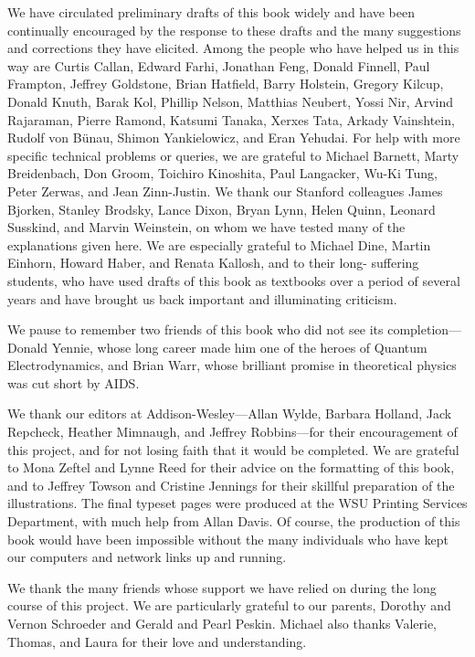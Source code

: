 We have circulated preliminary drafts of this book widely and have been
continually encouraged by the response to these drafts and the many
suggestions and corrections they have elicited.  Among the people who have
helped us in this way are Curtis Callan, Edward Farhi, Jonathan Feng,
Donald Finnell, Paul Frampton, Jeffrey Goldstone, Brian Hatfield, Barry
Holstein, Gregory Kilcup, Donald Knuth, Barak Kol, Phillip Nelson,
Matthias Neubert, Yossi Nir, Arvind Rajaraman, Pierre Ramond, Katsumi
Tanaka, Xerxes Tata, Arkady Vainshtein, Rudolf von B\"unau, Shimon
Yankielowicz, and Eran Yehudai.  For help with more specific technical
problems or queries, we are grateful to Michael Barnett, Marty
Breidenbach, Don Groom, Toichiro Kinoshita, Paul Langacker, Wu-Ki Tung,
Peter Zerwas, and Jean Zinn-Justin.  We thank our Stanford colleagues
James Bjorken, Stanley Brodsky, Lance Dixon, Bryan Lynn, Helen Quinn,
Leonard Susskind, and Marvin Weinstein, on whom we have tested many of the
explanations given here.  We are especially grateful to Michael Dine,
Martin Einhorn, Howard Haber, and Renata Kallosh, and to their long-
suffering students, who have used drafts of this book as textbooks over a
period of several years and have brought us back important and
illuminating criticism.

We pause to remember two friends of this book who did not see its
completion---Donald Yennie, whose long career made him one of the heroes
of Quantum Electrodynamics, and Brian Warr, whose brilliant promise in
theoretical physics was cut short by AIDS.

We thank our editors at Addison-Wesley---Allan Wylde, Barbara Holland,
Jack Repcheck, Heather Mimnaugh, and Jeffrey Robbins---for their
encouragement of this project, and for not losing faith that it would be
completed.  We are grateful to Mona Zeftel and Lynne Reed for their advice
on the formatting of this book, and to Jeffrey Towson and Cristine
Jennings for their skillful preparation of the illustrations.  The final
typeset pages were produced at the WSU Printing Services Department, with
much help from Allan Davis.  Of course, the production of this book would
have been impossible without the many individuals who have kept our
computers and network links up and running.

We thank the many friends whose support we have relied on during the long
course of this project.  We are particularly grateful to our parents,
Dorothy and Vernon Schroeder and Gerald and Pearl Peskin.  Michael also
thanks Valerie, Thomas, and Laura for their love and understanding.

